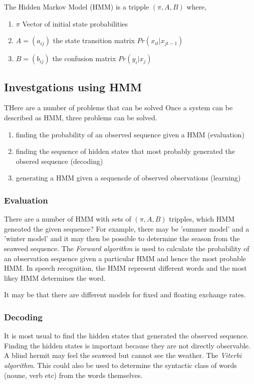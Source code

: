 \documentclass[12pt, a4paper, oneside]{article} %
\begin{document}
The Hidden Markov Model (HMM) is a tripple $(\pi, A, B)$ where, 
\begin{enumerate}
\item $\pi$ Vector of initial state probabilities
\item $A = (a_{ij})$ the state transition matrix $Pr(x_{it}|x_{jt-1})$
\item $B = (b_{ij})$ the confusion matrix $Pr(y_i|x_j)$
\end{enumerate}


\subsection{Investgations using HMM}
THere are a number of problems that can be solved 
Once a system can be described as HMM, three problems can be solved. 
\begin{enumerate}
\item finding the probability of an observed sequence given a HMM (evaluation)
\item finding the sequence of hidden states that most probably generated the obsered sequence (decoding)
\item generating a HMM given a sequencde of observed observations (learning)
\end{enumerate}

\subsubsection{Evaluation}
There are a number of HMM with sets of $(\pi, A, B)$ tripples, which HMM geneated the given sequence?  For example, there may be 'summer model' and a 'winter model' and it may then be possible to determine the season from the seaweed sequence. The \emph{Forward algorithm} is used to calculate the probability of an observation sequence given a particular HMM and hence the most probable HMM.  In speech recognition, the HMM represent different words and the most likey HMM determines the word. 

It may be that there are different models for fixed and floating exchange rates. 
\subsubsection{Decoding}
It is most usual to find the hidden states that generated the observed sequence.  Finding the hidden states is important because they are not directly observable.  A blind hermit may feel the seaweed but cannot see the weather. The \emph{Viterbi algorithm}.  This could also be used to determine the syntactic class of words (noune, verb etc) from the words themselves.  
\end{document}
